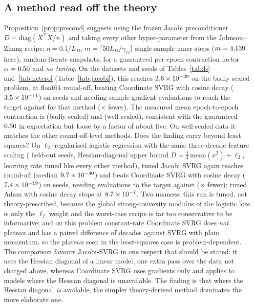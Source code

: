 \documentclass[11pt]{article}
\theoremstyle{remark}
\begin{document}
\subsection{A method read off the theory}\label{sec:jacobi}
Proposition~\ref{prop:precond} suggests using the frozen Jacobi preconditioner $D=\mathrm{diag}(X^\top X/n)$ and taking every other hyper-parameter from the Johnson--Zhang recipe: $\eta=0.1/L_D$, $m=\lceil 50L_D/\gamma_D\rceil$ single-sample inner steps ($m=4{,}139$ here), random-iterate snapshots, for a guaranteed per-epoch contraction factor $\alpha=0.50$ and \emph{no tuning}. On the datasets and seeds of Tables~\ref{tab:ls} and~\ref{tab:hetero} (Table~\ref{tab:jacobi}), this reaches $2.6\times 10^{-29}$ on the badly scaled problem, at float64 round-off, beating Coordinate SVRG with cosine decay ($3.5\times 10^{-11}$) on \ExpElevenBadWins{} seeds and needing \ExpElevenEvalsTheory{} sample-gradient evaluations to reach the target against \ExpElevenEvalsCoord{} for that method (\ExpElevenSpeedup$\times$ fewer). The measured mean epoch-to-epoch contraction is \ExpElevenContractionBad{} (badly scaled) and \ExpElevenContractionGood{} (well-scaled), consistent with the guaranteed $0.50$ in expectation but loose by a factor of about five. On well-scaled data it matches the other round-off-level methods.
Does the finding carry beyond least squares? On $\ell_2$-regularised logistic regression with the same three-decade feature scaling (\ExpTwelveSeeds{} held-out seeds, Hessian-diagonal upper bound $D=\tfrac14\,\mathrm{mean}(x^2)+\ell_2$, learning rate tuned like every other method), tuned Jacobi SVRG again reaches round-off (median $9.7\times 10^{-30}$) and beats Coordinate SVRG with cosine decay ($7.4\times 10^{-19}$) on \ExpTwelveWins{} seeds, needing \ExpTwelveEvalsJacobi{} evaluations to the target against \ExpTwelveEvalsCoord{} (\ExpTwelveSpeedup$\times$ fewer); tuned Adam with cosine decay stops at $8.7\times 10^{-7}$. Two nuances: this run is tuned, not theory-prescribed, because the global strong-convexity modulus of the logistic loss is only the $\ell_2$ weight and the worst-case recipe is far too conservative to be informative; and on this problem constant-rate Coordinate SVRG does \emph{not} plateau and has a paired difference of \ExpTwelveAdaptiveVsMomentum{} decades against SVRG with plain momentum, so the plateau seen in the least-squares case is problem-dependent.
The comparison favours Jacobi-SVRG in one respect that should be stated: it uses the Hessian diagonal of a linear model, one extra pass over the data not charged above, whereas Coordinate SVRG uses gradients only and applies to models where the Hessian diagonal is unavailable. The finding is that where the Hessian diagonal \emph{is} available, the simpler theory-derived method dominates the more elaborate one.
\end{document}
